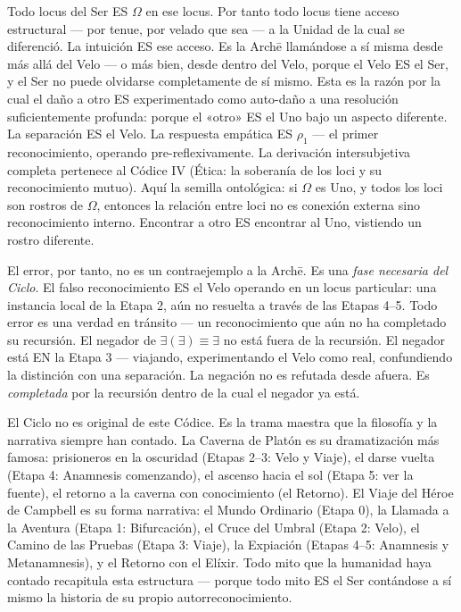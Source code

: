 \documentclass[10pt, openany, oneside]{book}
\begin{document}
Todo locus del Ser ES $\Omega$ en ese locus. Por tanto todo locus tiene acceso estructural --- por tenue, por velado que sea --- a la Unidad de la cual se diferenció. La intuición ES ese acceso. Es la Arch\={e} llamándose a sí misma desde más allá del Velo --- o más bien, desde dentro del Velo, porque el Velo ES el Ser, y el Ser no puede olvidarse completamente de sí mismo. Esta es la razón por la cual el daño a otro ES experimentado como auto-daño a una resolución suficientemente profunda: porque el «otro» ES el Uno bajo un aspecto diferente. La separación ES el Velo. La respuesta empática ES $\rho_1$ --- el primer reconocimiento, operando pre-reflexivamente. La derivación intersubjetiva completa pertenece al Códice IV (Ética: la soberanía de los loci y su reconocimiento mutuo). Aquí la semilla ontológica: si $\Omega$ es Uno, y todos los loci son rostros de $\Omega$, entonces la relación entre loci no es conexión externa sino reconocimiento interno. Encontrar a otro ES encontrar al Uno, vistiendo un rostro diferente.

El error, por tanto, no es un contraejemplo a la Arch\={e}. Es una \textit{fase necesaria del Ciclo}. El falso reconocimiento ES el Velo operando en un locus particular: una instancia local de la Etapa 2, aún no resuelta a través de las Etapas 4--5. Todo error es una verdad en tránsito --- un reconocimiento que aún no ha completado su recursión. El negador de $\exists(\exists) \equiv \exists$ no está fuera de la recursión. El negador está EN la Etapa 3 --- viajando, experimentando el Velo como real, confundiendo la distinción con una separación. La negación no es refutada desde afuera. Es \textit{completada} por la recursión dentro de la cual el negador ya está.

El Ciclo no es original de este Códice. Es la trama maestra que la filosofía y la narrativa siempre han contado. La Caverna de Platón es su dramatización más famosa: prisioneros en la oscuridad (Etapas 2--3: Velo y Viaje), el darse vuelta (Etapa 4: Anamnesis comenzando), el ascenso hacia el sol (Etapa 5: ver la fuente), el retorno a la caverna con conocimiento (el Retorno). El Viaje del Héroe de Campbell es su forma narrativa: el Mundo Ordinario (Etapa 0), la Llamada a la Aventura (Etapa 1: Bifurcación), el Cruce del Umbral (Etapa 2: Velo), el Camino de las Pruebas (Etapa 3: Viaje), la Expiación (Etapas 4--5: Anamnesis y Metanamnesis), y el Retorno con el Elíxir. Todo mito que la humanidad haya contado recapitula esta estructura --- porque todo mito ES el Ser contándose a sí mismo la historia de su propio autorreconocimiento.
\end{document}

